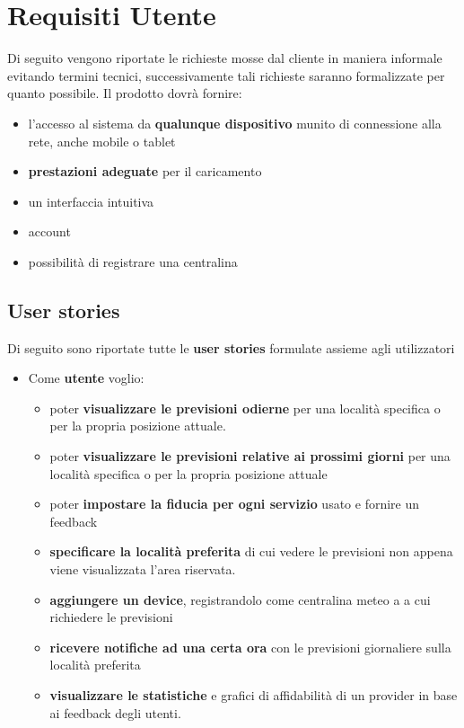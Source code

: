 	\section{Requisiti Utente}
	Di seguito vengono riportate le richieste mosse dal cliente in maniera informale evitando termini tecnici, successivamente tali richieste saranno formalizzate per quanto possibile.
	Il prodotto dovrà fornire: 
		\begin{itemize}
            \item l'accesso al sistema da \textbf{qualunque dispositivo} munito di connessione alla rete, anche mobile o tablet
            \item \textbf{prestazioni adeguate} per il caricamento
            \item un interfaccia intuitiva
            \item account
            \item possibilità di registrare una centralina
        \end{itemize}
        \subsection{User stories}
        Di seguito sono riportate tutte le \textbf{user stories} formulate assieme agli utilizzatori
        \begin{itemize}
            \item Come \textbf{utente}
            voglio:
            \begin{itemize}
                \item poter \textbf{visualizzare le previsioni odierne} per una località specifica o per la propria posizione attuale.
                \item poter \textbf{visualizzare le previsioni relative ai prossimi giorni} per una località specifica o per la propria posizione attuale
                \item poter \textbf{impostare la fiducia per ogni servizio} usato e fornire un feedback
                \item \textbf{specificare la località preferita} di cui vedere le previsioni non appena viene visualizzata l'area riservata.
                \item \textbf{aggiungere un device}, registrandolo come centralina meteo a a cui richiedere le previsioni
                \item \textbf{ricevere notifiche ad una certa ora} con le previsioni giornaliere sulla località preferita
                \item \textbf{visualizzare le statistiche} e grafici di affidabilità di un provider in base ai feedback degli utenti.
                
            \end{itemize}
        \end{itemize}
            
